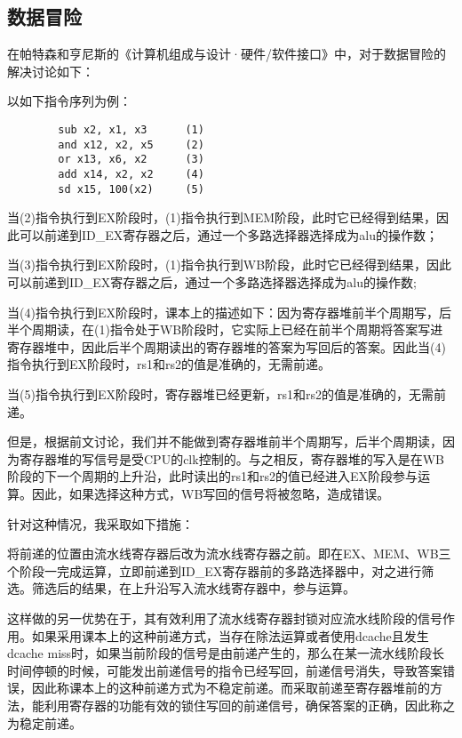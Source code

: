 \documentclass{article}
\begin{document}
        \subsection{数据冒险}
        \par{}
        在帕特森和亨尼斯的《计算机组成与设计·硬件/软件接口》{\cite{ref1}}中，对于数据冒险的解决讨论如下：
        \par{}
        以如下指令序列为例：
        \begin{verbatim}
        sub x2, x1, x3      (1)
        and x12, x2, x5     (2)
        or x13, x6, x2      (3)
        add x14, x2, x2     (4)
        sd x15, 100(x2)     (5)
        \end{verbatim}
        \par{}
        当(2)指令执行到EX阶段时，(1)指令执行到MEM阶段，此时它已经得到结果，因此可以前递到ID\_EX寄存器之后，通过一个多路选择器选择成为alu的操作数；
        \par{}
        当(3)指令执行到EX阶段时，(1)指令执行到WB阶段，此时它已经得到结果，因此可以前递到ID\_EX寄存器之后，通过一个多路选择器选择成为alu的操作数;
        \par{}
        当(4)指令执行到EX阶段时，课本上的描述如下：因为寄存器堆前半个周期写，后半个周期读，在(1)指令处于WB阶段时，它实际上已经在前半个周期将答案写进寄存器堆中，因此后半个周期读出的寄存器堆的答案为写回后的答案。因此当(4)指令执行到EX阶段时，rs1和rs2的值是准确的，无需前递。
        \par{}
        当(5)指令执行到EX阶段时，寄存器堆已经更新，rs1和rs2的值是准确的，无需前递。
        \newline{}
        \par{}
        但是，根据前文讨论，我们并不能做到寄存器堆前半个周期写，后半个周期读，因为寄存器堆的写信号是受CPU的clk控制的。与之相反，寄存器堆的写入是在WB阶段的下一个周期的上升沿，此时读出的rs1和rs2的值已经进入EX阶段参与运算。因此，如果选择这种方式，WB写回的信号将被忽略，造成错误。
        \par{}
        针对这种情况，我采取如下措施：
        \par{}
        将前递的位置由流水线寄存器后改为流水线寄存器之前。即在EX、MEM、WB三个阶段一完成运算，立即前递到ID\_EX寄存器前的多路选择器中，对之进行筛选。筛选后的结果，在上升沿写入流水线寄存器中，参与运算。
        \par{}
        这样做的另一优势在于，其有效利用了流水线寄存器封锁对应流水线阶段的信号作用。如果采用课本上的这种前递方式，当存在除法运算或者使用dcache且发生dcache miss时，如果当前阶段的信号是由前递产生的，那么在某一流水线阶段长时间停顿的时候，可能发出前递信号的指令已经写回，前递信号消失，导致答案错误，因此称课本上的这种前递方式为不稳定前递。而采取前递至寄存器堆前的方法，能利用寄存器的功能有效的锁住写回的前递信号，确保答案的正确，因此称之为稳定前递。
\end{document}
